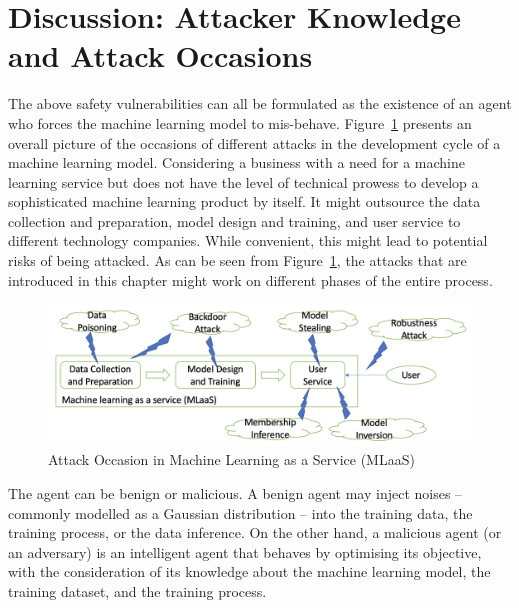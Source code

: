 \fi

\section{Discussion: Attacker Knowledge and Attack Occasions}\label{sec:attackknowlege}

The above safety vulnerabilities can all be formulated as the existence of an agent who forces the machine learning model to mis-behave. Figure~\ref{fig:MLaaS} presents an overall picture of the occasions of different attacks in the development cycle of a machine learning model. Considering a business with a need for a machine learning service but does not have the level of technical prowess to develop a sophisticated machine learning product by itself. It might outsource the data collection and preparation, model design and training, and user service to different technology companies. While convenient, this might lead to potential risks of being attacked. As can be seen from Figure~\ref{fig:MLaaS}, the attacks that are introduced in this chapter might work on different phases of the entire process. 

\begin{figure}
    \centering
    \includegraphics[width=\textwidth]{SafetyIssues/MLaaS.png}
    \caption{Attack Occasion in Machine Learning as a Service (MLaaS)}
    \label{fig:MLaaS}
\end{figure}


The agent can be benign or malicious. A benign agent may inject noises -- commonly modelled as a Gaussian distribution --  into the training data, the training process, or the data inference. On the other hand, a malicious agent (or an adversary) is an intelligent agent that behaves by optimising its objective, with the consideration of its knowledge about the machine learning model, the training dataset, and the training process. 

